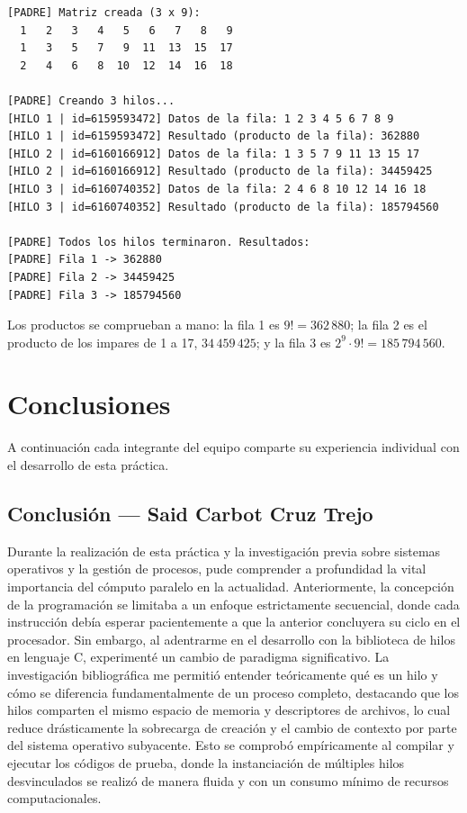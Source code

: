 \begin{lstlisting}[numbers=none, language={}, caption={Ejecución de \texttt{./programa}.}, label={lst:prac03:salida-programa}]
[PADRE] Matriz creada (3 x 9):
  1   2   3   4   5   6   7   8   9 
  1   3   5   7   9  11  13  15  17 
  2   4   6   8  10  12  14  16  18 

[PADRE] Creando 3 hilos...
[HILO 1 | id=6159593472] Datos de la fila: 1 2 3 4 5 6 7 8 9
[HILO 1 | id=6159593472] Resultado (producto de la fila): 362880
[HILO 2 | id=6160166912] Datos de la fila: 1 3 5 7 9 11 13 15 17
[HILO 2 | id=6160166912] Resultado (producto de la fila): 34459425
[HILO 3 | id=6160740352] Datos de la fila: 2 4 6 8 10 12 14 16 18
[HILO 3 | id=6160740352] Resultado (producto de la fila): 185794560

[PADRE] Todos los hilos terminaron. Resultados:
[PADRE] Fila 1 -> 362880
[PADRE] Fila 2 -> 34459425
[PADRE] Fila 3 -> 185794560
\end{lstlisting}


Los productos se comprueban a mano: la fila 1 es $9! = 362\,880$; la fila 2 es el producto de los impares de 1 a 17, $34\,459\,425$; y la fila 3 es $2^9 \cdot 9! = 185\,794\,560$.

\section{Conclusiones}
\label{sec:prac03:conclusiones}

A continuación cada integrante del equipo comparte su experiencia individual con el desarrollo de esta práctica.

\clearpage
\subsection{Conclusión — Said Carbot Cruz Trejo}
\label{sec:prac03:concl:said}

Durante la realización de esta práctica y la investigación previa sobre sistemas operativos y la gestión de procesos, pude comprender a profundidad la vital importancia del cómputo paralelo en la actualidad. Anteriormente, la concepción de la programación se limitaba a un enfoque estrictamente secuencial, donde cada instrucción debía esperar pacientemente a que la anterior concluyera su ciclo en el procesador. Sin embargo, al adentrarme en el desarrollo con la biblioteca de hilos en lenguaje C, experimenté un cambio de paradigma significativo. La investigación bibliográfica me permitió entender teóricamente qué es un hilo y cómo se diferencia fundamentalmente de un proceso completo, destacando que los hilos comparten el mismo espacio de memoria y descriptores de archivos, lo cual reduce drásticamente la sobrecarga de creación y el cambio de contexto por parte del sistema operativo subyacente. Esto se comprobó empíricamente al compilar y ejecutar los códigos de prueba, donde la instanciación de múltiples hilos desvinculados se realizó de manera fluida y con un consumo mínimo de recursos computacionales.


